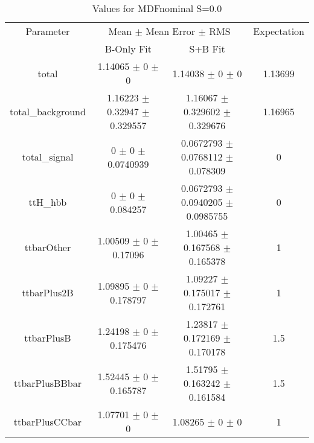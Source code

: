 \begin{table}
\centering
\caption{Values for MDFnominal S=0.0}
\begin{tabular}{cccc}
\toprule
Parameter & \multicolumn{2}{c}{Mean $\pm$ Mean Error $\pm$ RMS} & Expectation\\
 & B-Only Fit & S+B Fit & \\
\midrule
total & \num{1.14065} $\pm$ \num{0} $\pm$ \num{0} & \num{1.14038} $\pm$ \num{0} $\pm$ \num{0} & \num{1.13699}\\
total\_background & \num{1.16223} $\pm$ \num{0.32947} $\pm$ \num{0.329557} & \num{1.16067} $\pm$ \num{0.329602} $\pm$ \num{0.329676} & \num{1.16965}\\
total\_signal & \num{0} $\pm$ \num{0} $\pm$ \num{0.0740939} & \num{0.0672793} $\pm$ \num{0.0768112} $\pm$ \num{0.078309} & \num{0}\\
ttH\_hbb & \num{0} $\pm$ \num{0} $\pm$ \num{0.084257} & \num{0.0672793} $\pm$ \num{0.0940205} $\pm$ \num{0.0985755} & \num{0}\\
ttbarOther & \num{1.00509} $\pm$ \num{0} $\pm$ \num{0.17096} & \num{1.00465} $\pm$ \num{0.167568} $\pm$ \num{0.165378} & \num{1}\\
ttbarPlus2B & \num{1.09895} $\pm$ \num{0} $\pm$ \num{0.178797} & \num{1.09227} $\pm$ \num{0.175017} $\pm$ \num{0.172761} & \num{1}\\
ttbarPlusB & \num{1.24198} $\pm$ \num{0} $\pm$ \num{0.175476} & \num{1.23817} $\pm$ \num{0.172169} $\pm$ \num{0.170178} & \num{1.5}\\
ttbarPlusBBbar & \num{1.52445} $\pm$ \num{0} $\pm$ \num{0.165787} & \num{1.51795} $\pm$ \num{0.163242} $\pm$ \num{0.161584} & \num{1.5}\\
ttbarPlusCCbar & \num{1.07701} $\pm$ \num{0} $\pm$ \num{0} & \num{1.08265} $\pm$ \num{0} $\pm$ \num{0} & \num{1}\\
\bottomrule
\end{tabular}
\end{table}